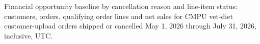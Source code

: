 Financial opportunity baseline by cancellation reason and line-item status: customers, orders, qualifying order lines and net sales for CMPU vet-diet customer-upload orders shipped or cancelled May 1, 2026 through July 31, 2026, inclusive, UTC.
